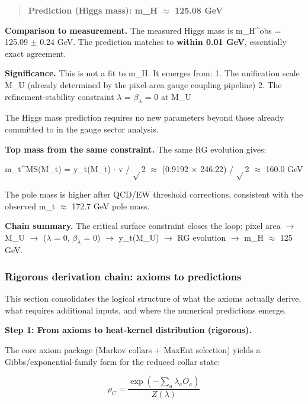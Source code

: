 \documentclass[11pt,a4paper]{article}
\theoremstyle{remark}
\begin{document}
\begin{quote}
\textbf{Prediction (Higgs mass): m\_H \ensuremath{\approx} 125.08 GeV}
\end{quote}

\textbf{Comparison to measurement.} The measured Higgs mass is m\_H\^{}obs = 125.09 \ensuremath{\pm} 0.24 GeV. The prediction matches to \textbf{within 0.01 GeV}, essentially exact agreement.

\textbf{Significance.} This is not a fit to m\_H. It emerges from:
1. The unification scale M\_U (already determined by the pixel-area gauge coupling pipeline)
2. The refinement-stability constraint \ensuremath{\lambda} = \(\beta_{\lambda}\) = 0 at M\_U

The Higgs mass prediction requires no new parameters beyond those already committed to in the gauge sector analysis.

\textbf{Top mass from the same constraint.} The same RG evolution gives:

m\_t\^{}MS(M\_t) = y\_t(M\_t) \ensuremath{\cdot} v / \ensuremath{\sqrt{}}2 \ensuremath{\approx} (0.9192 \ensuremath{\times} 246.22) / \ensuremath{\sqrt{}}2 \ensuremath{\approx} 160.0 GeV

The pole mass is higher after QCD/EW threshold corrections, consistent with the observed m\_t \ensuremath{\approx} 172.7 GeV pole mass.

\textbf{Chain summary.} The critical surface constraint closes the loop: pixel area \ensuremath{\to} M\_U \ensuremath{\to} (\ensuremath{\lambda} = 0, \(\beta_{\lambda}\) = 0) \ensuremath{\to} y\_t(M\_U) \ensuremath{\to} RG evolution \ensuremath{\to} m\_H \ensuremath{\approx} 125 GeV.

\subsubsection{Rigorous derivation chain: axioms to predictions}\label{rigorous-derivation-chain-axioms-to-predictions}

This section consolidates the logical structure of what the axioms actually derive, what requires additional inputs, and where the numerical predictions emerge.

\textbf{Step 1: From axioms to heat-kernel distribution (rigorous).}

The core axiom package (Markov collars + MaxEnt selection) yields a Gibbs/exponential-family form for the reduced collar state:

\[
\rho_C = \frac{\exp(-\sum_a \lambda_a O_a)}{Z(\lambda)}
\]
\end{document}
